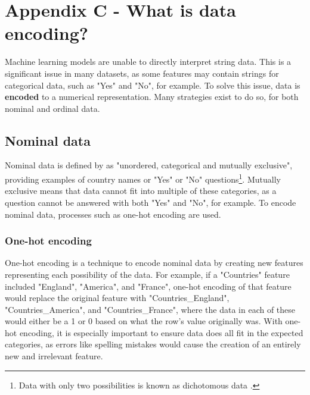 \begingroup
\renewcommand\thechapter{C}
\titleformat{\chapter}[display]
{\normalfont\huge\bfseries}{}{20pt}{\Huge}
\setcounter{section}{0} %

\chapter*{Appendix C - What is data encoding?}

Machine learning models are unable to directly interpret string data. This is a significant issue 
in many datasets, as some features may contain strings for categorical data, such as "Yes" and "No", for example.
To solve this issue, data is \textbf{encoded} to a numerical representation. Many strategies exist to do so,
for both nominal and ordinal data.

\section{Nominal data}
Nominal data is defined by \textcite{oxford_brookes_university_types_nodate} as "unordered, categorical 
and mutually exclusive", providing examples of country names or "Yes" or "No" questions\footnote{Data with only two possibilities is known as dichotomous data \autocite{oxford_brookes_university_types_nodate}.}.
Mutually exclusive means that data cannot fit into multiple of these categories, as a question cannot be answered with both "Yes" and 
"No", for example. To encode nominal data, processes such as one-hot encoding are used.

\subsection{One-hot encoding}
One-hot encoding is a technique to encode nominal data by creating new features representing each possibility of the data.
For example, if a "Countries" feature included "England", "America", and "France", one-hot encoding of that feature would 
replace the original feature with "Countries\_England", "Countries\_America", and "Countries\_France", where the data in each of these 
would either be a 1 or 0 based on what the row's value originally was. With one-hot encoding, it is especially important to ensure 
data does all fit in the expected categories, as errors like spelling mistakes would cause the creation of an entirely new and 
irrelevant feature.

